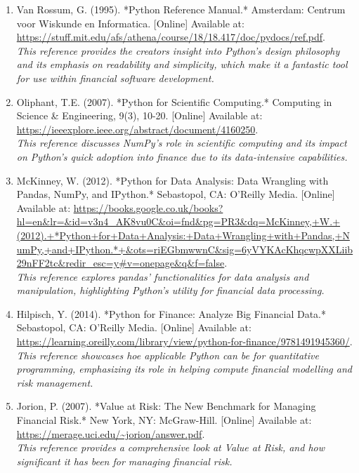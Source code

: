 \documentclass{article}
\begin{document}
\begin{small}
  \begin{enumerate}

    \item\label{ref18} Van Rossum, G. (1995). *Python Reference Manual.* Amsterdam: Centrum voor Wiskunde en Informatica. [Online] Available at: \url{https://stuff.mit.edu/afs/athena/course/18/18.417/doc/pydocs/ref.pdf}.
    \\\textit{This reference provides the creators insight into Python's design philosophy and its emphasis on readability and simplicity, which make it a fantastic tool for use within financial software development.}

    \item\label{ref19} Oliphant, T.E. (2007). *Python for Scientific Computing.* Computing in Science \& Engineering, 9(3), 10-20. [Online] Available at: \url{https://ieeexplore.ieee.org/abstract/document/4160250}.
    \\\textit{This reference discusses NumPy's role in scientific computing and its impact on Python's quick adoption into finance due to its data-intensive capabilities.}

    \item\label{ref20} McKinney, W. (2012). *Python for Data Analysis: Data Wrangling with Pandas, NumPy, and IPython.* Sebastopol, CA: O'Reilly Media. [Online] Available at: \url{https://books.google.co.uk/books?hl=en&lr=&id=v3n4_AK8vu0C&oi=fnd&pg=PR3&dq=McKinney,+W.+(2012).+*Python+for+Data+Analysis:+Data+Wrangling+with+Pandas,+NumPy,+and+IPython.*+&ots=riEGbmwwnC&sig=6yVYKAcKhqcwpXXLiib29nFF2tc&redir_esc=y#v=onepage&q&f=false}.
    \\\textit{This reference explores pandas' functionalities for data analysis and manipulation, highlighting Python's utility for financial data processing.}

    \item\label{ref21} Hilpisch, Y. (2014). *Python for Finance: Analyze Big Financial Data.* Sebastopol, CA: O'Reilly Media. [Online] Available at: \url{https://learning.oreilly.com/library/view/python-for-finance/9781491945360/}.
    \\\textit{This reference showcases hoe applicable Python can be for quantitative programming, emphasizing its role in helping compute financial modelling and risk management.}

    \item\label{ref22} Jorion, P. (2007). *Value at Risk: The New Benchmark for Managing Financial Risk.* New York, NY: McGraw-Hill. [Online] Available at: \url{https://merage.uci.edu/~jorion/answer.pdf}.
    \\\textit{This reference provides a comprehensive look at Value at Risk, and how significant it has been for managing financial risk.}

  \end{enumerate}
\end{small}
\end{document}
